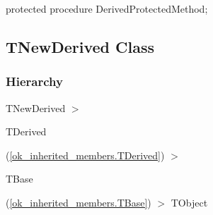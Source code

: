\documentclass{report}
\newif\ifpdf
\begin{document}
\label{ok_inherited_members.TDerived-DerivedProtectedMethod}
\begin{list}{}{
\setlength{\itemindent}{0cm}
\setlength{\listparindent}{0cm}
\setlength{\leftmargin}{\evensidemargin}
\addtolength{\leftmargin}{\tmplength}
\settowidth{\labelsep}{X}
\addtolength{\leftmargin}{\labelsep}
\setlength{\labelwidth}{\tmplength}
}
\item[\textbf{Declaration}\hfill]
\ifpdf
\begin{flushleft}
\fi
\begin{ttfamily}
protected procedure DerivedProtectedMethod;\end{ttfamily}

\ifpdf
\end{flushleft}
\fi

\end{list}
\ifpdf
\subsection*{\large{\textbf{TNewDerived Class}}\normalsize\hspace{1ex}\hrulefill}
\else
\subsection*{TNewDerived Class}
\fi
\label{ok_inherited_members.TNewDerived}
\subsubsection*{\large{\textbf{Hierarchy}}\normalsize\hspace{1ex}\hfill}
TNewDerived {$>$} \begin{ttfamily}TDerived\end{ttfamily}(\ref{ok_inherited_members.TDerived}) {$>$} \begin{ttfamily}TBase\end{ttfamily}(\ref{ok_inherited_members.TBase}) {$>$} 
TObject
\end{document}
